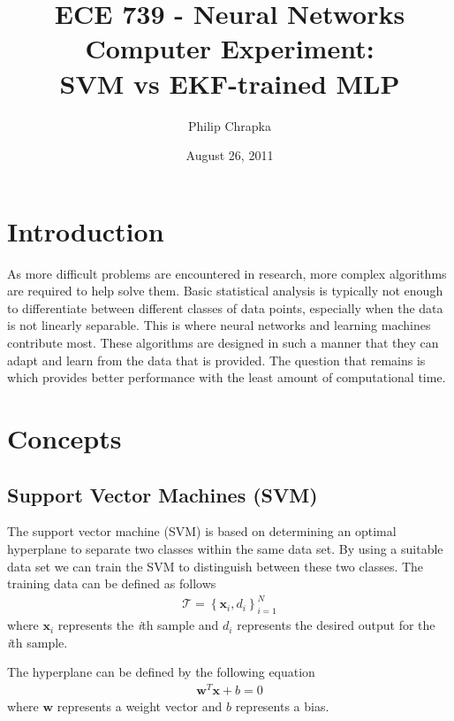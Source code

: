 \documentclass[11pt,letterpaper,titlepage]{article}
\numberwithin{equation}{section}
\numberwithin{figure}{section}
\numberwithin{table}{section}
\begin{document}
\title{ECE 739 - Neural Networks\\Computer Experiment:\\SVM vs EKF-trained MLP}
\author{Philip Chrapka}
\date{August 26, 2011}
\maketitle

\tableofcontents
\clearpage

\section{Introduction}

As more difficult problems are encountered in research, more complex algorithms are required to help solve them. Basic statistical analysis is typically not enough to differentiate between different classes of data points, especially when the data is not linearly separable. This is where neural networks and learning machines contribute most. These algorithms are designed in such a manner that they can adapt and learn from the data that is provided. The question that remains is which provides better performance with the least amount of computational time.

\section{Concepts}
\label{sec:concepts}

\subsection{Support Vector Machines (SVM)}

The support vector machine (SVM) is based on determining an optimal hyperplane to separate two classes within the same data set. By using a suitable data set we can train the SVM to distinguish between these two classes. The training data can be defined as follows
\begin{gather}
  \mathcal{T} = \left\{ \mathbf{x}_i, d_i \right\}_{i=1}^{N}
\end{gather}
where \(\mathbf{x}_i\) represents the \textit{i}th sample and \(d_i\) represents the desired output for the \textit{i}th sample.

The hyperplane can be defined by the following equation
\begin{gather}
	\label{eq:hyperplane}
	\mathbf{w}^T\mathbf{x} + b = 0
\end{gather}
where \(\mathbf{w}\) represents a weight vector and \(b\) represents a bias.
\end{document}
